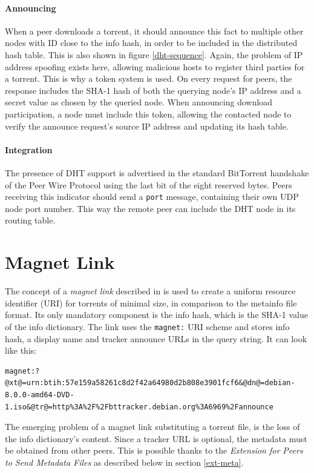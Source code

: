 \documentclass[10pt, a4paper, twoside=false, headsepline]{scrbook}
\renewcommand{\_}{\origunderscore\allowbreak}
\begin{document}
\paragraph{Announcing}
When a peer downloads a torrent, it should announce this fact to multiple other nodes with ID close to the info hash, in order to be included in the distributed hash table. This is also shown in figure \ref{dht-sequence}. Again, the problem of IP address spoofing exists here, allowing malicious hosts to register third parties for a torrent. This is why a token system is used. On every request for peers, the response includes the SHA-1 hash of both the querying node's IP address and a secret value as chosen by the queried node. When announcing download participation, a node must include this token, allowing the contacted node to verify the announce request's source IP address and updating its hash table.

\paragraph{Integration}
The presence of DHT support is advertised in the standard BitTorrent handshake of the Peer Wire Protocol using the last bit of the eight reserved bytes. Peers receiving this indicator should send a \texttt{port} message, containing their own UDP node port number. This way the remote peer can include the DHT node in its routing table.

\section{Magnet Link}
\label{magnet}
The concept of a \emph{magnet link} described in \cite{bep9} is used to create a uniform resource identifier (URI) for torrents of minimal size, in comparison to the metainfo file format. Its only mandatory component is the info hash, which is the SHA-1 value of the info dictionary. The link uses the \texttt{magnet:} URI scheme and stores info hash, a display name and tracker announce URLs in the query string. It can look like this:
\begin{lstlisting}
magnet:?@xt@=urn:btih:57e159a58261c8d2f42a64980d2b808e3901fcf6&@dn@=debian-8.0.0-amd64-DVD-1.iso&@tr@=http%3A%2F%2Fbttracker.debian.org%3A6969%2Fannounce
\end{lstlisting}
The emerging problem of a magnet link substituting a torrent file, is the loss of the info dictionary's content. Since a tracker URL is optional, the metadata must be obtained from other peers. This is possible thanks to the \emph{Extension for Peers to Send Metadata Files} as described below in section \ref{ext-meta}.
\end{document}
